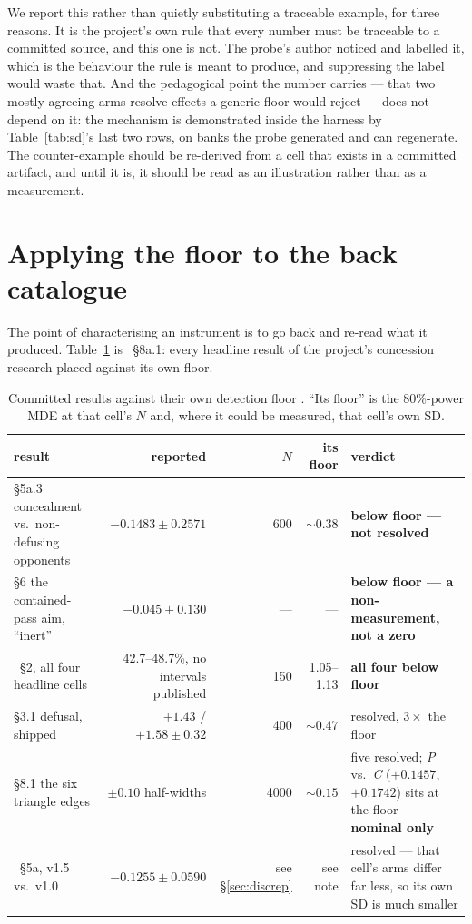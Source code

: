 \documentclass[11pt]{article}
\begin{document}
We report this rather than quietly substituting a traceable example, for three reasons. It is the
project's own rule that every number must be traceable to a committed source, and this one is not.
The probe's author noticed and labelled it, which is the behaviour the rule is meant to produce, and
suppressing the label would waste that. And the pedagogical point the number carries --- that two
mostly-agreeing arms resolve effects a generic floor would reject --- does not depend on it: the
mechanism is demonstrated inside the harness by Table~\ref{tab:sd}'s last two rows, on banks the
probe generated and can regenerate. The counter-example should be re-derived from a cell that exists
in a committed artifact, and until it is, it should be read as an illustration rather than as a
measurement.

\section{Applying the floor to the back catalogue}
\label{sec:catalogue}

The point of characterising an instrument is to go back and re-read what it produced.
Table~\ref{tab:catalogue} is \cite{concession}~\S8a.1: every headline result of the project's
concession research placed against its own floor.

\begin{table}[ht]
\centering
\caption{Committed results against their own detection floor \cite{concession}. ``Its floor'' is the
80\%-power MDE at that cell's $N$ and, where it could be measured, that cell's own SD.}
\label{tab:catalogue}
\small
\begin{tabular}{p{} r r r p{}}
\toprule
result & reported & $N$ & its floor & verdict \\
\midrule
\S5a.3 concealment vs.\ non-defusing opponents & $-0.1483 \pm 0.2571$ & 600 & ${\sim}0.38$ &
  \textbf{below floor --- not resolved} \\
\S6 the contained-pass aim, ``inert'' & $-0.045 \pm 0.130$ & --- & --- &
  \textbf{below floor --- a non-measurement, not a zero} \\
\cite{crossplay}~\S2, all four headline cells & 42.7--48.7\%, no intervals published & 150 &
  1.05--1.13 & \textbf{all four below floor} \\
\S3.1 defusal, shipped & $+1.43$ / $+1.58 \pm 0.32$ & 400 & ${\sim}0.47$ & resolved, $3\times$ the
  floor \\
\S8.1 the six triangle edges & $\pm 0.10$ half-widths & 4000 & ${\sim}0.15$ & five resolved; \emph{P}
  vs.\ \emph{C} ($+0.1457$, $+0.1742$) sits at the floor --- \textbf{nominal only} \\
\cite{bounded}~\S5a, v1.5 vs.\ v1.0 & $-0.1255 \pm 0.0590$ & see \S\ref{sec:discrep} & see note &
  resolved --- that cell's arms differ far less, so its own SD is much smaller \\
\bottomrule
\end{tabular}
\end{table}
\end{document}
